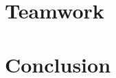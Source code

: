 \documentclass[10pt,pdf]{beamer}
\begin{document}
\section{Teamwork}


\section{Conclusion}



%
\end{document}
